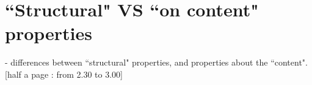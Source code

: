 \section{``Structural" VS ``on content" properties}

- differences between ``structural" properties, and properties about the ``content".
[half a page : from 2.30 to 3.00]